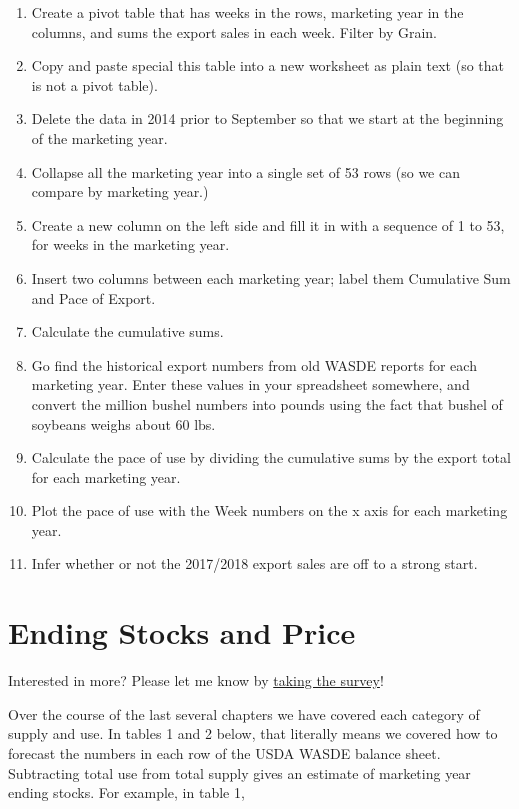 \documentclass[
  letterpaper,
  DIV=11,
  numbers=noendperiod]{scrreprt}
\begin{document}
\begin{enumerate}
\def\labelenumi{\arabic{enumi}.}
\setcounter{enumi}{2}
\item
  Create a pivot table that has weeks in the rows, marketing year in the
  columns, and sums the export sales in each week. Filter by Grain.
\item
  Copy and paste special this table into a new worksheet as plain text
  (so that is not a pivot table).
\item
  Delete the data in 2014 prior to September so that we start at the
  beginning of the marketing year.
\item
  Collapse all the marketing year into a single set of 53 rows (so we
  can compare by marketing year.)
\item
  Create a new column on the left side and fill it in with a sequence of
  1 to 53, for weeks in the marketing year.
\item
  Insert two columns between each marketing year; label them Cumulative
  Sum and Pace of Export.
\item
  Calculate the cumulative sums.
\item
  Go find the historical export numbers from old WASDE reports for each
  marketing year. Enter these values in your spreadsheet somewhere, and
  convert the million bushel numbers into pounds using the fact that
  bushel of soybeans weighs about 60 lbs.
\item
  Calculate the pace of use by dividing the cumulative sums by the
  export total for each marketing year.
\item
  Plot the pace of use with the Week numbers on the x axis for each
  marketing year.
\item
  Infer whether or not the 2017/2018 export sales are off to a strong
  start.
\end{enumerate}


\chapter{Ending Stocks and Price}\label{ending-stocks-and-price}

{Interested in more? Please let me know by}
\href{https://forms.gle/Q3VByCQZHjfQSy9D7}{taking the survey}!

Over the course of the last several chapters we have covered each
category of supply and use. In tables 1 and 2 below, that literally
means we covered how to forecast the numbers in each row of the USDA
WASDE balance sheet. Subtracting total use from total supply gives an
estimate of marketing year ending stocks. For example, in table 1,
\end{document}
